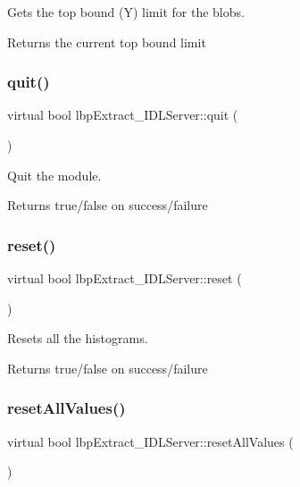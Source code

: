 Gets the top bound (Y) limit for the blobs. 

\begin{DoxyReturn}{Returns}
the current top bound limit 
\end{DoxyReturn}
\mbox{\label{classlbpExtract__IDLServer_a4086feb2a3cee548670673235277b6f0}} 
\subsubsection{\texorpdfstring{quit()}{quit()}}
{\footnotesize\ttfamily virtual bool lbp\+Extract\+\_\+\+I\+D\+L\+Server\+::quit (\begin{DoxyParamCaption}{ }\end{DoxyParamCaption})\hspace{0.3cm}{\ttfamily [virtual]}}



Quit the module. 

\begin{DoxyReturn}{Returns}
true/false on success/failure 
\end{DoxyReturn}
\mbox{\label{classlbpExtract__IDLServer_a9d9b1223c68851e94b0c8c0bd8d3cedc}} 
\subsubsection{\texorpdfstring{reset()}{reset()}}
{\footnotesize\ttfamily virtual bool lbp\+Extract\+\_\+\+I\+D\+L\+Server\+::reset (\begin{DoxyParamCaption}{ }\end{DoxyParamCaption})\hspace{0.3cm}{\ttfamily [virtual]}}



Resets all the histograms. 

\begin{DoxyReturn}{Returns}
true/false on success/failure 
\end{DoxyReturn}
\mbox{\label{classlbpExtract__IDLServer_a88f2492af4a66eaf9be8ceb28c862fe5}} 
\subsubsection{\texorpdfstring{resetAllValues()}{resetAllValues()}}
{\footnotesize\ttfamily virtual bool lbp\+Extract\+\_\+\+I\+D\+L\+Server\+::reset\+All\+Values (\begin{DoxyParamCaption}{ }\end{DoxyParamCaption})\hspace{0.3cm}{\ttfamily [virtual]}}




